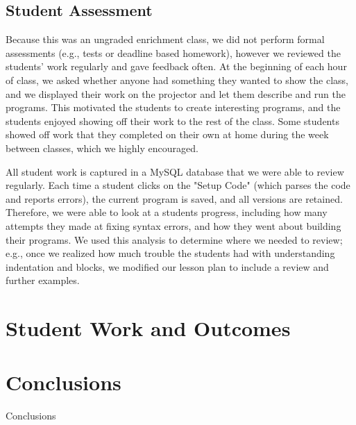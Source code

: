 \documentclass{sig-alternate}
\begin{document}
\subsection{Student Assessment}
Because this was an ungraded enrichment class, we did not perform formal assessments (e.g., tests
or deadline based homework), however we reviewed the students' work regularly and gave feedback
often.  At the beginning of each hour of class, we asked whether anyone had something they wanted
to show the class, and we displayed their work on the projector and let them describe and run the
programs.  This motivated the students to create interesting programs, and the students enjoyed
showing off their work to the rest of the class.  Some students showed off work that they completed
on their own at home during the week between classes, which we highly encouraged.

All student work is captured in a MySQL database that we were able to review regularly.  Each time
a student clicks on the "Setup Code" (which parses the code and reports errors), the current
program is saved, and all versions are retained.  Therefore, we were able to look at a students 
progress, including how many attempts they made at fixing syntax errors, and how they went about
building their programs.  We used this analysis to determine where we needed to review; e.g.,
once we realized how much trouble the students had with understanding indentation and blocks, we
modified our lesson plan to include a review and further examples.

\section{Student Work and Outcomes}

\section{Conclusions}
Conclusions



%

%
%
\end{document}
